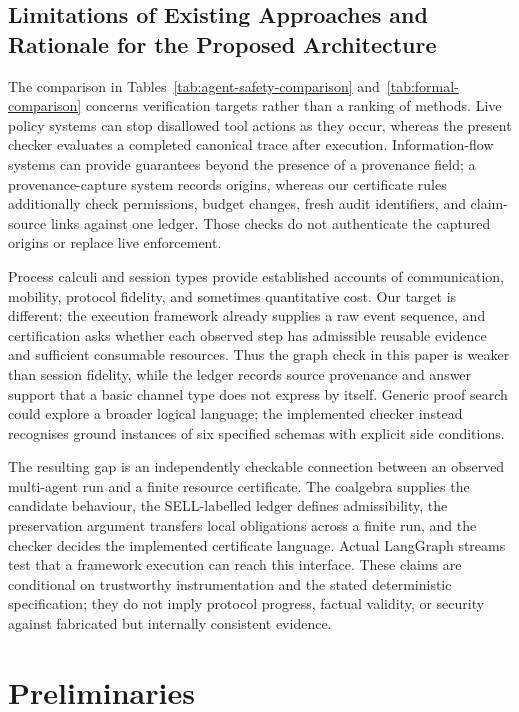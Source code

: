 \documentclass[a4paper,fleqn]{cas-sc}
\begin{document}
\subsection{Limitations of Existing Approaches and Rationale for the Proposed Architecture}

The comparison in Tables~\ref{tab:agent-safety-comparison}
and~\ref{tab:formal-comparison} concerns verification targets rather than a
ranking of methods. Live policy systems can stop disallowed tool actions as
they occur, whereas the present checker evaluates a completed canonical trace
after execution. Information-flow systems can provide guarantees beyond the
presence of a provenance field; a provenance-capture system records origins,
whereas our certificate rules additionally check permissions, budget changes,
fresh audit identifiers, and claim-source links against one ledger. Those
checks do not authenticate the captured origins or replace live enforcement.

Process calculi and session types provide established accounts of
communication, mobility, protocol fidelity, and sometimes quantitative cost.
Our target is different: the execution framework already supplies a raw event
sequence, and certification asks whether each observed step has admissible
reusable evidence and sufficient consumable resources. Thus the graph check in
this paper is weaker than session fidelity, while the ledger records source
provenance and answer support that a basic channel type does not express by
itself. Generic proof search could explore a broader logical language; the
implemented checker instead recognises ground instances of six specified
schemas with explicit side conditions.

The resulting gap is an independently checkable connection between an observed
multi-agent run and a finite resource certificate. The coalgebra supplies the
candidate behaviour, the SELL-labelled ledger defines admissibility, the
preservation argument transfers local obligations across a finite run, and the
checker decides the implemented certificate language. Actual LangGraph streams
test that a framework execution can reach this interface. These claims are
conditional on trustworthy instrumentation and the stated deterministic
specification; they do not imply protocol progress, factual validity, or
security against fabricated but internally consistent evidence.

\section{Preliminaries}
\end{document}
